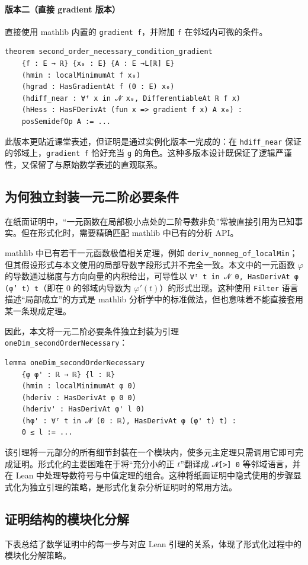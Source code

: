 ﻿\documentclass[UTF8,a4paper,zihao=-4]{ctexart}
\begin{document}
\paragraph{版本二（直接 gradient 版本）}直接使用 mathlib 内置的 \texttt{gradient f}，并附加 \texttt{f} 在邻域内可微的条件。
\begin{verbatim}
theorem second_order_necessary_condition_gradient
    {f : E → ℝ} {x₀ : E} {A : E →L[ℝ] E}
    (hmin : localMinimumAt f x₀)
    (hgrad : HasGradientAt f (0 : E) x₀)
    (hdiff_near : ∀ᶠ x in 𝓝 x₀, DifferentiableAt ℝ f x)
    (hHess : HasFDerivAt (fun x => gradient f x) A x₀) :
    posSemidefOp A := ...
\end{verbatim}
此版本更贴近课堂表述，但证明是通过实例化版本一完成的：在 \texttt{hdiff\_near} 保证的邻域上，\texttt{gradient f} 恰好充当 \texttt{g} 的角色。这种多版本设计既保证了逻辑严谨性，又保留了与原始数学表述的直观联系。

\subsection{为何独立封装一元二阶必要条件}
在纸面证明中，“一元函数在局部极小点处的二阶导数非负”常被直接引用为已知事实。但在形式化时，需要精确匹配 mathlib 中已有的分析 API。

mathlib 中已有若干一元函数极值相关定理，例如 \texttt{deriv\_nonneg\_of\_localMin}；但其假设形式与本文使用的局部导数字段形式并不完全一致。本文中的一元函数 \(\varphi\) 的导数通过梯度与方向向量的内积给出，可导性以 \texttt{∀ᶠ t in 𝓝 0, HasDerivAt φ (φ' t) t}（即在 0 的邻域内导数为 \(\varphi'(t)\)）的形式出现。这种使用 \texttt{Filter} 语言描述“局部成立”的方式是 mathlib 分析学中的标准做法，但也意味着不能直接套用某一条现成定理。

因此，本文将一元二阶必要条件独立封装为引理 \texttt{oneDim\_secondOrderNecessary}：
\begin{verbatim}
lemma oneDim_secondOrderNecessary
    {φ φ' : ℝ → ℝ} {l : ℝ}
    (hmin : localMinimumAt φ 0)
    (hderiv : HasDerivAt φ 0 0)
    (hderiv' : HasDerivAt φ' l 0)
    (hφ' : ∀ᶠ t in 𝓝 (0 : ℝ), HasDerivAt φ (φ' t) t) :
    0 ≤ l := ...
\end{verbatim}
该引理将一元部分的所有细节封装在一个模块内，使多元主定理只需调用它即可完成证明。形式化的主要困难在于将“充分小的正 \(t\)”翻译成 \texttt{𝓝[>] 0} 等邻域语言，并在 Lean 中处理导数符号与中值定理的组合。这种将纸面证明中隐式使用的步骤显式化为独立引理的策略，是形式化复杂分析证明时的常用方法。

\subsection{证明结构的模块化分解}
下表总结了数学证明中的每一步与对应 Lean 引理的关系，体现了形式化过程中的模块化分解策略。
\end{document}
